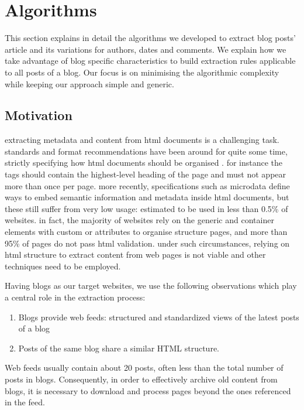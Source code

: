 \section{Algorithms}
\label{algorithms}

This section explains in detail the algorithms we developed to extract blog posts' article and its variations for authors, dates and comments.
We explain how we take advantage of blog specific characteristics to build extraction rules applicable to all posts of a blog.
Our focus is on minimising the algorithmic complexity while keeping our approach simple and generic.


\subsection{Motivation}
\label{motivation}

extracting metadata and content from html documents is a challenging task. standards and format recommendations have been around for quite some time, strictly specifying how html documents should be organised \cite{w3c2013}. for instance the  tags should contain the highest-level heading of the page and must not appear more than once per page\cite{w3c2002}. more recently, specifications such as microdata\cite{whatwg2013} define ways to embed semantic information and metadata inside html documents, but these still suffer from very low usage: estimated to be used in less than 0.5\%\cite{andrewrogers2013} of websites. in fact, the majority of websites rely on the generic  and  container elements with custom  or  attributes to organise structure pages\cite{brianwilson2008}, and more than 95\% of pages do not pass html validation\cite{brianwilson2008-a}. under such circumstances, relying on html structure to extract content from web pages is not viable and other techniques need to be employed.


Having blogs as our target websites, we use the following observations  which play a central role in the extraction process:
\begin{enumerate}[label={(\arabic*)}]
  \item\label{havefeedAssum} Blogs provide web feeds: structured and standardized views of the latest posts of a blog
  \item\label{similarhtmlAssum} Posts of the same blog share a similar HTML structure.
\end{enumerate}
Web feeds usually contain about 20 posts\cite{oita2010}, often less than the total number of posts in blogs.  Consequently, in order to effectively archive old content from blogs, it is necessary to download and process pages beyond the ones referenced in the feed.


